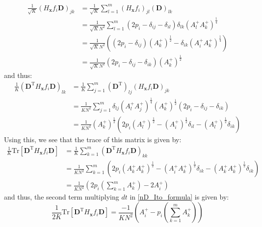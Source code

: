 \begin{align}
\frac{1}{\sqrt{K}}\left(H_{\mathbf{x}} f_i \mathbf{D}\right)_{jk} &= \frac{1}{\sqrt{K}}\sum\limits_{l=1}^{m} \left(H_{\mathbf{x}} f_i \right)_{jl}\left(\mathbf{D}\right)_{lk}\nonumber\\
&= \frac{1}{\sqrt{K}N^2}\sum\limits_{l=1}^{m}\left(2p_i - \delta_{ij} - \delta_{il}\right)\delta_{lk}\left(A^{+}_{l}A^{+}_{k}\right)^{\frac{1}{4}}\\
&=  \frac{1}{\sqrt{K}N^2}\left(\left(2p_i -\delta_{ij}\right)(A^{+}_{k})^{\frac{1}{2}} -\delta_{ik}\left(A^{+}_{i}A^{+}_{k}\right)^{\frac{1}{4}}\right)\\
&= \frac{1}{\sqrt{K}N^2}\left(2p_i -\delta_{ij} -\delta_{ik}\right)(A^{+}_{k})^{\frac{1}{2}}
\end{align}
and thus:
\begin{align}
\frac{1}{K}\left(\mathbf{D}^{\mathrm{T}} H_{\mathbf{x}} f_i \mathbf{D}\right)_{lk} &=\frac{1}{K}\sum\limits_{j=1}^{m}\left(\mathbf{D}^{\mathrm{T}}\right)_{lj}\left(H_{\mathbf{x}} f_i \mathbf{D}\right)_{jk}\nonumber\\
&=  \frac{1}{KN^2}\sum\limits_{j=1}^{m}\delta_{lj}\left(A^{+}_{l}A^{+}_{j}\right)^{\frac{1}{4}}(A^{+}_{k})^{\frac{1}{2}}\left(2p_i -\delta_{ij} -\delta_{ik}\right)\\
&=  \frac{1}{KN^2}(A^{+}_{k})^{\frac{1}{2}}\left(2p_i(A^{+}_{l})^{\frac{1}{2}} - (A^{+}_{i})^{\frac{1}{2}}\delta_{il} - (A^{+}_{l})^{\frac{1}{2}}\delta_{ik}\right)
\end{align}
Using this, we see that the trace of this matrix is given by:
\begin{align}
\frac{1}{K}\mathrm{Tr}[\mathbf{D}^{\mathrm{T}} H_{\mathbf{x}} f_i \mathbf{D}] &= \frac{1}{K}\sum\limits_{k=1}^{m}\left(\mathbf{D}^{\mathrm{T}} H_{\mathbf{x}} f_i \mathbf{D}\right)_{kk}\nonumber\\
&= \frac{1}{KN^2}\sum\limits_{k=1}^{m}\left(2p_i(A^{+}_{k}A^{+}_{k})^{\frac{1}{2}} - (A^{+}_{i}A^{+}_{k})^{\frac{1}{2}}\delta_{ik} - (A^{+}_{k}A^{+}_{k})^{\frac{1}{2}}\delta_{ik}\right)\\
&= \frac{1}{KN^2}\left(2p_i\left(\sum\limits_{k=1}^{m} A^{+}_k\right) - 2A^{+}_{i}\right)
\end{align}
and thus, the second term multiplying $dt$ in \eqref{nD_Ito_formula} is given by:
\begin{equation}
\frac{1}{2K}\mathrm{Tr}[\mathbf{D}^{\mathrm{T}} H_{\mathbf{x}} f_i \mathbf{D}] =  \frac{-1}{KN^2}\left(A^{+}_{i}-p_i\left(\sum\limits_{k=1}^{m} A^{+}_k\right)\right)\label{nD_for_Ito_second_term}
\end{equation}
